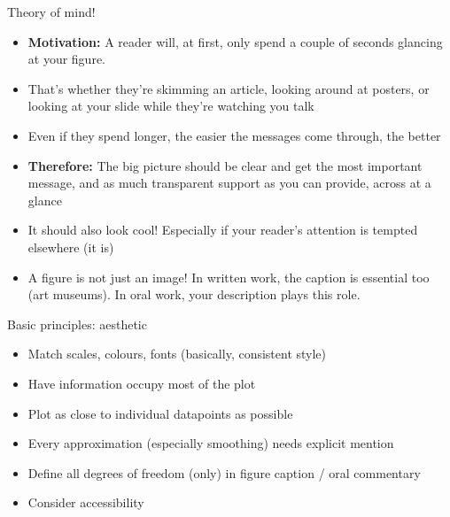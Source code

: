 \documentclass[10pt]{beamer}
\begin{document}
\begin{frame}{Theory of mind!}
    \begin{itemize}[<+->]
    \item \textbf{Motivation:} A reader will, at first, only spend a couple of seconds glancing at your figure.
      \item That's whether they're skimming an article, looking around at posters, or looking at your slide while they're watching you talk
      \item Even if they spend longer, the easier the messages come through, the better
      \item \textbf{Therefore:} The big picture should be clear and get the most important message, and as much transparent support as you can provide, across at a glance
        \item It should also look cool! Especially if your reader's attention is tempted elsewhere (it is)
      \item A figure is not just an image! In written work, the caption is essential too (art museums). In oral work, your description plays this role.
      \end{itemize}
\end{frame}


\begin{frame}{Basic principles: aesthetic}
    \begin{itemize}
    \item Match scales, colours, fonts (basically, consistent style)
    \item Have information occupy most of the plot
    \item Plot as close to individual datapoints as possible
    \item Every approximation (especially smoothing) needs explicit mention
    \item Define all degrees of freedom (only) in figure caption / oral commentary
      \item Consider accessibility
  \end{itemize}
\end{frame}
\end{document}
